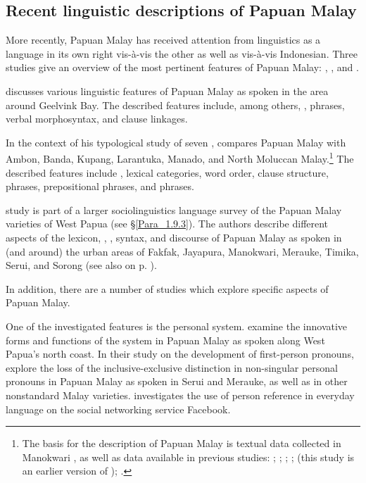 {\subsection{Recent linguistic descriptions of Papuan Malay}
\label{Para_1.9.2}
More recently, Papuan Malay has received attention from linguistics as a language in its own right vis-à-vis the other  as well as vis-à-vis Indonesian. Three studies give an overview of the most pertinent features of Papuan Malay: \citet{Donohue.2003}, \citet{Paauw.2009}, and \citet{Scott.2008}.



\citet{Donohue.2003} discusses various linguistic features of Papuan Malay as spoken in the area around Geelvink Bay. The described features include, among others, ,  phrases, verbal morphosyntax, and clause linkages.



In the context of his typological study of seven , {\citet{Paauw.2009}} compares Papuan Malay with Ambon, Banda, Kupang, Larantuka, Manado, and North Moluccan Malay.\footnote{The basis for the description of Papuan Malay is textual data collected in Manokwari \citep[35]{Paauw.2009}, as well as data available in previous studies: \citet{Suharno.1981};  \citet{vanVelzen.1995}; \citet{Donohue.2003}; \cite{Burung.2007}; {\citet{Kim.2007}} (this study is an earlier version of \citealt{Scott.2008}); {\citet{Sawaki.2007}}.} The described features include , lexical categories, word order, clause structure,  phrases, prepositional phrases, and  phrases.



 study is part of a larger sociolinguistics language survey of the Papuan Malay varieties of West Papua (see §\ref{Para_1.9.3}). The authors describe different aspects of the lexicon, , , syntax, and discourse of Papuan Malay as spoken in (and around) the urban areas of Fakfak, Jayapura, Manokwari, Merauke, Timika, Serui, and Sorong (see also  on p. \pageref{Figure_0.2}).



In addition, there are a number of studies which explore specific aspects of Papuan Malay.



One of the investigated features is the personal  system. \cite{Donohue.2007d} examine the innovative forms and functions of the  system in Papuan Malay as spoken along West Papua’s north coast. In their study on the development of  first-person pronouns, \cite{Donohue.1998} explore the loss of the inclusive-exclusive distinction in non-singular personal pronouns in Papuan Malay as spoken in Serui and Merauke, as well as in other nonstandard Malay varieties. \citet{Saragih.2012} investigates the use of person reference in everyday language on the social networking service Facebook.

}
